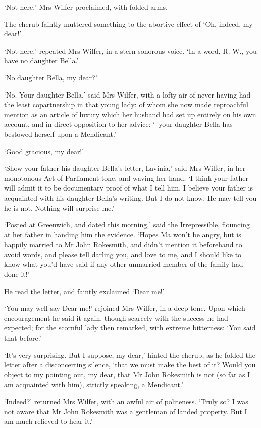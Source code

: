 ‘Not here,’ Mrs Wilfer proclaimed, with folded arms.

The cherub faintly muttered something to the abortive effect of ‘Oh,
indeed, my dear!’

‘Not here,’ repeated Mrs Wilfer, in a stern sonorous voice. ‘In a word,
R. W., you have no daughter Bella.’

‘No daughter Bella, my dear?’

‘No. Your daughter Bella,’ said Mrs Wilfer, with a lofty air of never
having had the least copartnership in that young lady: of whom she now
made reproachful mention as an article of luxury which her husband had
set up entirely on his own account, and in direct opposition to her
advice: ‘--your daughter Bella has bestowed herself upon a Mendicant.’

‘Good gracious, my dear!’

‘Show your father his daughter Bella’s letter, Lavinia,’ said Mrs
Wilfer, in her monotonous Act of Parliament tone, and waving her hand.
‘I think your father will admit it to be documentary proof of what I
tell him. I believe your father is acquainted with his daughter Bella’s
writing. But I do not know. He may tell you he is not. Nothing will
surprise me.’

‘Posted at Greenwich, and dated this morning,’ said the Irrepressible,
flouncing at her father in handing him the evidence. ‘Hopes Ma won’t be
angry, but is happily married to Mr John Rokesmith, and didn’t mention
it beforehand to avoid words, and please tell darling you, and love
to me, and I should like to know what you’d have said if any other
unmarried member of the family had done it!’

He read the letter, and faintly exclaimed ‘Dear me!’

‘You may well say Dear me!’ rejoined Mrs Wilfer, in a deep tone. Upon
which encouragement he said it again, though scarcely with the success
he had expected; for the scornful lady then remarked, with extreme
bitterness: ‘You said that before.’

‘It’s very surprising. But I suppose, my dear,’ hinted the cherub, as he
folded the letter after a disconcerting silence, ‘that we must make the
best of it? Would you object to my pointing out, my dear, that Mr
John Rokesmith is not (so far as I am acquainted with him), strictly
speaking, a Mendicant.’

‘Indeed?’ returned Mrs Wilfer, with an awful air of politeness. ‘Truly
so? I was not aware that Mr John Rokesmith was a gentleman of landed
property. But I am much relieved to hear it.’

